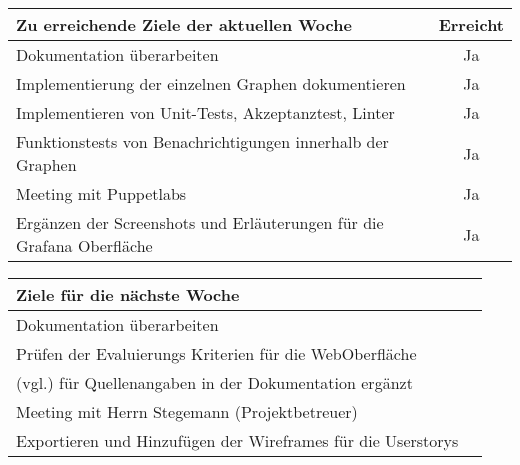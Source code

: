 \begin{tabularx}{\textwidth}{Xc}
    \arrayrulecolor{OliveGreen}
    \toprule
    {\bfseries Zu erreichende Ziele der aktuellen Woche} & {\bfseries Erreicht} \\
    \midrule[2pt]
    Dokumentation überarbeiten                              &Ja              \\
    \rowcolor{OliveGreen!15}
    Implementierung der einzelnen Graphen dokumentieren     &Ja              \\
    \rowcolor{White}
    Implementieren von Unit-Tests, Akzeptanztest, Linter    &Ja              \\
    \rowcolor{OliveGreen!15}
    Funktionstests von Benachrichtigungen innerhalb der Graphen  &Ja         \\
    \rowcolor{White}
    Meeting mit Puppetlabs                                  &Ja              \\
    \rowcolor{OliveGreen!15}
    Ergänzen der Screenshots und Erläuterungen für die Grafana Oberfläche &Ja \\
   \bottomrule[2pt]
\end{tabularx}
%
\vspace{1cm}
%
\begin{tabularx}{\textwidth}{Xc}
    \arrayrulecolor{OliveGreen}
    \toprule
    {\bfseries Ziele für die nächste Woche}        &                         \\
    \midrule[2pt]
    Dokumentation überarbeiten                     &                         \\
    \rowcolor{OliveGreen!15}
    Prüfen der Evaluierungs Kriterien für die WebOberfläche  &               \\
    \rowcolor{White}
    (vgl.) für Quellenangaben in der Dokumentation ergänzt    &              \\
    \rowcolor{OliveGreen!15}
    Meeting mit Herrn Stegemann (Projektbetreuer)      &                     \\
    \rowcolor{White}
    Exportieren und Hinzufügen der Wireframes für die Userstorys  &          \\
\end{tabularx}
